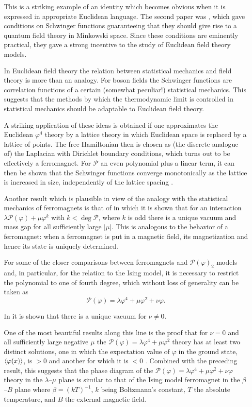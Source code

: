 This is a striking example of an identity which becomes obvious when it is
expressed in appropriate Euclidean language. The second paper was \cite{pct-app-36}, which
gave conditions on Schwinger functions guaranteeing that they should give rise
to a quantum field theory in Minkowski space. Since these conditions are
eminently practical, they gave a strong incentive to the study of Euclidean
field theory models.

In Euclidean field theory the relation between statistical mechanics and field
theory is more than an analogy. For boson fields the Schwinger functions are
correlation functions of a certain (somewhat peculiar!) statistical mechanics.
This suggests that the methods by which the thermodynamic limit is controlled
in statistical mechanics should be adaptable to Euclidean field theory.

A striking application of these ideas is obtained if one approximates the
Euclidean $\varphi^4$ theory by a lattice theory in which Euclidean space is
replaced by a lattice of points. The free Hamiltonian then is chosen as (the
discrete analogue of) the Laplacian with Dirichlet boundary conditions, which
turns out to be effectively a ferromagnet. For $\mathcal{P}$ an even
polynomial plus a linear term, it can then be shown that the Schwinger
functions converge monotonically as the lattice is increased in size,
independently of the lattice spacing \cite{pct-app-37,pct-app-38}.

Another result which is plausible in view of the analogy with the statistical
mechanics of ferromagnets is that of \cite{pct-app-39} in which it is shown that for an
interaction $\lambda\mathcal{P}(\varphi)+\mu\varphi^k$ with
$k<\deg\mathcal{P}$, where $k$ is odd there is a unique vacuum and mass gap
for all sufficiently large $|\mu|$. This is analogous to the behavior of a
ferromagnet: when a ferromagnet is put in a magnetic field, its magnetization
and hence its state is uniquely determined.

For some of the closer comparisons between ferromagnets and
$\mathcal{P}(\varphi)_2$ models and, in particular, for the relation to the
Ising model, it is necessary to restrict the polynomial to one of fourth
degree, which without loss of generality can be taken as
\[
  \mathcal{P}(\varphi)=\lambda\varphi^4+\mu\varphi^2+\nu\varphi.
\]

In \cite{pct-app-40,pct-app-41} it is shown that there is a unique vacuum for $\nu\neq0$.

One of the most beautiful results along this line is the proof that for
$\nu=0$ and all sufficiently large negative $\mu$ the
$\mathcal{P}(\varphi)=\lambda\varphi^4+\mu\varphi^2$ theory has at least two
distinct solutions, one in which the expectation value of $\varphi$ in the
ground state, $\langle \varphi(x)\rangle$, is $>0$ and another for which it is $<0$
\cite{pct-app-42}. Combined with the preceding result, this suggests that the phase diagram
of the $\mathcal{P}(\varphi)=\lambda\varphi^4+\mu\varphi^2+\nu\varphi$
theory in the $\lambda$--$\mu$ plane is similar to that of the Ising model
ferromagnet in the $\beta$--$B$ plane where $\beta=(kT)^{-1}$, $k$ being
Boltzmann's constant, $T$ the absolute temperature, and $B$ the external
magnetic field.

